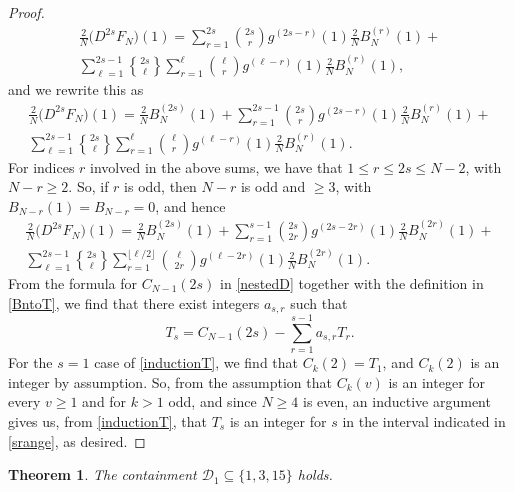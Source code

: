 \documentclass[12pt]{article}
\newtheorem{theorem}{Theorem}
\DeclareRobustCommand{\stirling}{\genfrac\{\}{0pt}{}}
\begin{document}
\begin{proof}
\begin{multline*}
 \frac{2}{N} \big( D^{2s} F_{N} \big)(1) = \sum_{r=1}^{2s} \binom{2s}{r} g^{(2s - r)}(1) \frac{2}{N} B_{N}^{(r)}(1) + \\ 
 \sum_{\ell = 1}^{2s-1} \stirling{2s}{\ell} \sum_{r=1}^{\ell} \binom{\ell}{r} g^{(\ell - r)}(1) \frac{2}{N} B_{N}^{(r)}(1), 
\end{multline*}
 and we rewrite this as 
\begin{multline*}
 \frac{2}{N} \big( D^{2s} F_{N} \big)(1) = \frac{2}{N} B_{N}^{(2s)}(1) + \sum_{r=1}^{2s-1} \binom{2s}{r} g^{(2s - r)}(1) \frac{2}{N} B_{N}^{(r)}(1) 
 + \\ 
 \sum_{\ell = 1}^{2s-1} \stirling{2s}{\ell} \sum_{r=1}^{\ell} \binom{\ell}{r} g^{(\ell - r)}(1) \frac{2}{N} B_{N}^{(r)}(1). 
\end{multline*}
 For indices $r$ involved in the above sums, we have that $1 \leq r \leq 2s \leq N-2$, 
 with $N - r \geq 2$. So, if $r$ is odd, then $N - r$ is odd and $\geq 3$, 
 with $B_{N-r}(1) = B_{N - r} = 0$, and hence
\begin{multline*}
 \frac{2}{N} \big( D^{2s} F_{N} \big)(1) = \frac{2}{N} B_{N}^{(2s)}(1) + \sum_{r=1}^{s-1} \binom{2s}{2r} g^{(2s - 2r)}(1) \frac{2}{N} B_{N}^{(2r)}(1) 
 + \\ 
 \sum_{\ell = 1}^{2s-1} \stirling{2s}{\ell} \sum_{ r = 1 }^{ \lfloor {\ell}/{2} \rfloor} \binom{\ell}{2r} g^{(\ell - 2r)}(1) \frac{2}{N} B_{N}^{(2r)}(1). 
\end{multline*}
 From the formula for $C_{N - 1}(2s)$ in \eqref{nestedD} together with the definition in \eqref{BntoT}, we find that there exist integers 
 $a_{s, r}$ such that 
\begin{equation}\label{inductionT} 
 T_{s} = C_{N-1}(2s) - \sum_{r=1}^{s-1} a_{s, r} T_{r}. 
\end{equation}
 For the $s = 1$ case of \eqref{inductionT}, we find that $C_{k}(2) = T_{1}$, and $C_{k}(2) $ is an integer by assumption. So, from the 
 assumption that $C_{k}(v)$ is an integer for every $v \geq 1$ and for $k > 1$ odd, and since $N \geq 4$ is even,  an inductive argument 
 gives us, from  \eqref{inductionT}, that $T_{s}$ is an integer for 
 $s$ in the interval indicated in \eqref{srange}, 
 as desired. 
\end{proof}

\begin{theorem}\label{maintheorem}
 The containment $\mathcal{D}_{1} \subseteq \{ 1, 3, 15 \}$ holds. 
\end{theorem}
\end{document}
